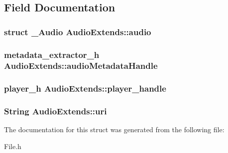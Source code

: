 \subsection{Field Documentation}
\subsubsection[{audio}]{\setlength{\rightskip}{0pt plus 5cm}struct {\bf \-\_\-\-Audio} Audio\-Extends\-::audio}\label{structAudioExtends_adc9639b5d2095eaa4448eabcf64a5e29}
\subsubsection[{audio\-Metadata\-Handle}]{\setlength{\rightskip}{0pt plus 5cm}metadata\-\_\-extractor\-\_\-h Audio\-Extends\-::audio\-Metadata\-Handle}\label{structAudioExtends_a4fe2efe9d2248269495270bf363575c5}
\subsubsection[{player\-\_\-handle}]{\setlength{\rightskip}{0pt plus 5cm}player\-\_\-h Audio\-Extends\-::player\-\_\-handle}\label{structAudioExtends_abbed38c2e4038c11cfcc5f67f1c07177}
\subsubsection[{uri}]{\setlength{\rightskip}{0pt plus 5cm}String Audio\-Extends\-::uri}\label{structAudioExtends_a0ed432fe28e9a4da0014815627c6103d}


The documentation for this struct was generated from the following file\-:\begin{DoxyCompactItemize}
\item 
File.\-h\end{DoxyCompactItemize}
